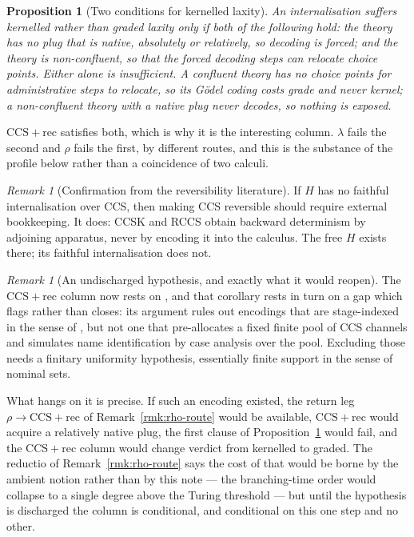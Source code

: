 \documentclass[11pt,a4paper]{article}
\theoremstyle{definition}
\theoremstyle{plain}
\newtheorem{proposition}[definition]{Proposition}
\theoremstyle{remark}
\newtheorem{remark}[definition]{Remark}
\newcommand{\rhoc}{\rho}
\newcommand{\CCSrec}{\mathrm{CCS}{+}\mathrm{rec}}
\begin{document}
\begin{proposition}[Two conditions for kernelled laxity]
\label{prop:two-conditions}
An internalisation suffers kernelled rather than graded laxity only if both of the following hold:
the theory has no plug that is native, absolutely or relatively, so decoding is forced; and the
theory is non-confluent, so that the forced decoding steps can relocate choice points. Either alone
is insufficient. A confluent theory has no choice points for administrative steps to relocate, so its
Gödel coding costs grade and never kernel; a non-confluent theory with a native plug never decodes,
so nothing is exposed.
\end{proposition}

$\CCSrec$ satisfies both, which is why it is the interesting column. $\lambda$ fails the second and
$\rhoc$ fails the first, by different routes, and this is the substance of the profile below rather
than a coincidence of two calculi.

\begin{remark}[Confirmation from the reversibility literature]
\label{rmk:ccsk}
If $H$ has no faithful internalisation over CCS, then making CCS reversible should require external
bookkeeping. It does: CCSK \cite{ccsk} and RCCS \cite{rccs} obtain backward determinism by adjoining
apparatus, never by encoding it into the calculus. The free $H$ exists there; its faithful
internalisation does not.
\end{remark}

\begin{remark}[An undischarged hypothesis, and exactly what it would reopen]
\label{rmk:pool}
The $\CCSrec$ column now rests on \cite[Cor.~5.10]{probe}, and that corollary rests in turn on a gap
which \cite[Rmk.~5.11]{probe} flags rather than closes: its argument rules out encodings that are
stage-indexed in the sense of \cite[Def.~3.14(iii)]{probe}, but not one that pre-allocates a fixed
finite pool of CCS channels and simulates name identification by case analysis over the pool.
Excluding those needs a finitary uniformity hypothesis, essentially finite support in the sense of
nominal sets.

What hangs on it is precise. If such an encoding existed, the return leg
$\rhoc \to \CCSrec$ of Remark~\ref{rmk:rho-route} would be available, $\CCSrec$ would acquire a
relatively native plug, the first clause of Proposition~\ref{prop:two-conditions} would fail, and
the $\CCSrec$ column would change verdict from kernelled to graded. The reductio of
Remark~\ref{rmk:rho-route} says the cost of that would be borne by the ambient notion rather than by
this note --- the branching-time order would collapse to a single degree above the Turing threshold
--- but until the hypothesis is discharged the column is conditional, and conditional on this one
step and no other.
\end{remark}
\end{document}
